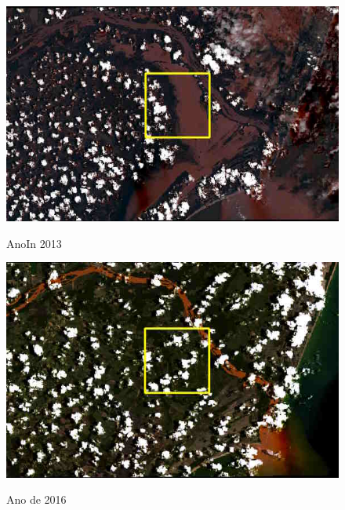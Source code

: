 			\begin{minipage}[t!]{0.33\textwidth}
				\begin{figure}[H]
					\centering \small \caption{AnoIn 2013}
					\includegraphics[width=0.97\linewidth]{FIGURAS/enche}
					\label{fig:indao} 
				\end{figure}			
			\end{minipage}\hfill
			\begin{minipage}[t!]{0.33\textwidth}
				\begin{figure}[H]
					\centering \small \caption{Ano de 2016}
					\includegraphics[width=0.97\linewidth]{FIGURAS/lamache1}
					\label{fig:indao2} 
				\end{figure}					
			\end{minipage} 
